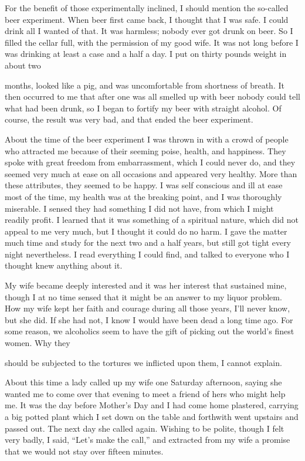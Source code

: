 \begin{biblechapter}
For the benefit of those experimentally inclined, I should mention the so-called beer experiment. When beer first came back, I thought that I was safe. I could drink all I wanted of that. It was harmless; nobody ever got drunk on beer. So I filled the cellar full, with the permission of my good wife. It was not long before I was drinking at least a case and a half a day. I put on thirty pounds weight in about two

months, looked like a pig, and was uncomfortable from shortness of breath. It then occurred to me that after one was all smelled up with beer nobody could tell what had been drunk, so I began to fortify my beer with straight alcohol. Of course, the result was very bad, and that ended the beer experiment.

About the time of the beer experiment I was thrown in with a crowd of people who attracted me because of their seeming poise, health, and happiness. They spoke with great freedom from embarrassment, which I could never do, and they seemed very much at ease on all occasions and appeared very healthy. More than these attributes, they seemed to be happy. I was self conscious and ill at ease most of the time, my health was at the breaking point, and I was thoroughly miserable. I sensed they had something I did not have, from which I might readily profit. I learned that it was something of a spiritual nature, which did not appeal to me very much, but I thought it could do no harm. I gave the matter much time and study for the next two and a half years, but still got tight every night nevertheless. I read everything I could find, and talked to everyone who I thought knew anything about it.

My wife became deeply interested and it was her interest that sustained mine, though I at no time sensed that it might be an answer to my liquor problem. How my wife kept her faith and courage during all those years, I’ll never know, but she did. If she had not, I know I would have been dead a long time ago. For some reason, we alcoholics seem to have the gift of picking out the world’s finest women. Why they

should be subjected to the tortures we inflicted upon them, I cannot explain.

About this time a lady called up my wife one Saturday afternoon, saying she wanted me to come over that evening to meet a friend of hers who might help me. It was the day before Mother’s Day and I had come home plastered, carrying a big potted plant which I set down on the table and forthwith went upstairs and passed out. The next day she called again. Wishing to be polite, though I felt very badly, I said, “Let’s make the call,” and extracted from my wife a promise that we would not stay over fifteen minutes.


\end{biblechapter}
